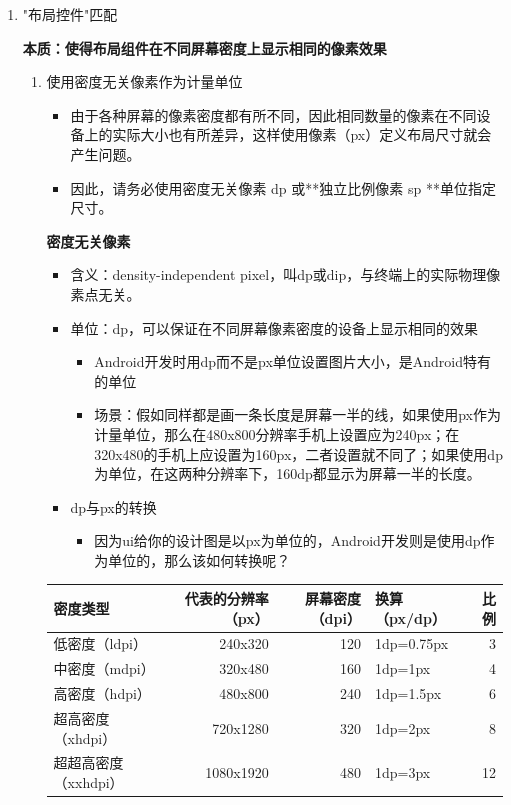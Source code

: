 \documentclass[9pt, b5paper]{article}
\begin{document}
\begin{enumerate}
\item "布局控件"匹配
\label{sec-6-6-2-1}

\textbf{本质：使得布局组件在不同屏幕密度上显示相同的像素效果}
\begin{enumerate}
\item 使用密度无关像素作为计量单位
\label{sec-6-6-2-1-1}
\begin{itemize}
\item 由于各种屏幕的像素密度都有所不同，因此相同数量的像素在不同设备上的实际大小也有所差异，这样使用像素（px）定义布局尺寸就会产生问题。
\item 因此，请务必使用密度无关像素 dp 或**独立比例像素 sp **单位指定尺寸。
\end{itemize}

\textbf{密度无关像素}
\begin{itemize}
\item 含义：density-independent pixel，叫dp或dip，与终端上的实际物理像素点无关。
\item 单位：dp，可以保证在不同屏幕像素密度的设备上显示相同的效果
\begin{itemize}
\item Android开发时用dp而不是px单位设置图片大小，是Android特有的单位
\item 场景：假如同样都是画一条长度是屏幕一半的线，如果使用px作为计量单位，那么在480x800分辨率手机上设置应为240px；在320x480的手机上应设置为160px，二者设置就不同了；如果使用dp为单位，在这两种分辨率下，160dp都显示为屏幕一半的长度。
\end{itemize}
\item dp与px的转换
\begin{itemize}
\item 因为ui给你的设计图是以px为单位的，Android开发则是使用dp作为单位的，那么该如何转换呢？
\end{itemize}
\end{itemize}
\begin{center}
\begin{tabular}{lrrlr}
\hline
密度类型 & 代表的分辨率（px） & 屏幕密度（dpi） & 换算（px/dp） & 比例\\
\hline
低密度（ldpi） & 240x320 & 120 & 1dp=0.75px & 3\\
中密度（mdpi） & 320x480 & 160 & 1dp=1px & 4\\
高密度（hdpi） & 480x800 & 240 & 1dp=1.5px & 6\\
超高密度（xhdpi） & 720x1280 & 320 & 1dp=2px & 8\\
超超高密度（xxhdpi） & 1080x1920 & 480 & 1dp=3px & 12\\
\hline
\end{tabular}
\end{center}


\end{enumerate}
\end{enumerate}
\end{document}
